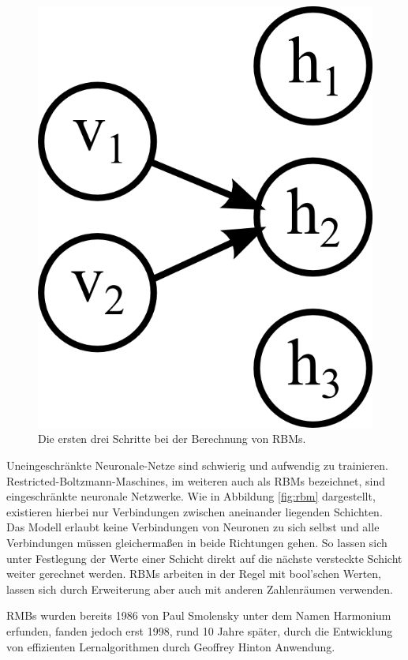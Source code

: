 \begin{figure}
{\begin{minipage}{0.33\textwidth}
	\includegraphics[scale=1]{images/rbm-step3.png}\end{minipage}}
\caption{Die ersten drei Schritte bei der Berechnung von RBMs.}
\label{fig:rbm-steps}
\end{figure}

Uneingeschränkte Neuronale-Netze sind schwierig und aufwendig zu trainieren. Restricted-Boltzmann-Maschines, im weiteren auch als RBMs bezeichnet, sind eingeschränkte neuronale Netzwerke. Wie in Abbildung \ref{fig:rbm} dargestellt, existieren hierbei nur Verbindungen zwischen aneinander liegenden Schichten. Das Modell erlaubt keine Verbindungen von Neuronen zu sich selbst und alle Verbindungen müssen gleichermaßen in beide Richtungen gehen. So lassen sich unter Festlegung der Werte einer Schicht direkt auf die nächste versteckte Schicht weiter gerechnet werden. RBMs arbeiten in der Regel mit bool'schen Werten, lassen sich durch Erweiterung aber auch mit anderen Zahlenräumen verwenden.

RMBs wurden bereits 1986 von Paul Smolensky  unter dem Namen Harmonium erfunden, fanden jedoch erst 1998, rund 10 Jahre später, durch die Entwicklung von effizienten Lernalgorithmen durch Geoffrey Hinton Anwendung.

